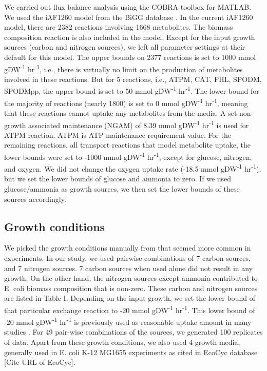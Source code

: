 \documentclass[12pt]{article}
\begin{document}
We carried out flux balance analysis using the COBRA toolbox \cite{Schellenbergeretal2011} for MATLAB. 
We used the iAF1260 model from the BiGG database \cite{Schellenbergeretal2010}. In the current iAF1260 model, there are 2382 reactions involving 1668 metabolites. The biomass composition reaction is also included in the model. Except for the input growth sources (carbon and nitrogen sources), we left all parameter settings at their default for this model. The upper bounds on 2377 reactions is set to 1000  mmol gDW\textsuperscript{-1} hr\textsuperscript{-1}, i.e., there is virtually no limit on the production of metabolites involved in these reactions. But for 5 reactions, i.e., ATPM, CAT, FHL, SPODM, SPODMpp, the upper bound is set to 50 mmol gDW\textsuperscript{-1} hr\textsuperscript{-1}. The lower bound for the majority of reactions (nearly 1800) is set to 0 mmol gDW\textsuperscript{-1} hr\textsuperscript{-1}, meaning that these reactions cannot uptake any metabolites from the media. A set non-growth associated maintenance (NGAM) of 8.39  mmol gDW\textsuperscript{-1} hr\textsuperscript{-1} is used for ATPM reaction. ATPM is ATP maintenance requirement value. For the remaining reactions, all transport reactions that model metabolite uptake, the lower bounds were set to -1000 mmol gDW\textsuperscript{-1} hr\textsuperscript{-1}, except for glucose, nitrogen, and oxygen. We did not change the oxygen uptake rate (-18.5 mmol gDW\textsuperscript{-1} hr\textsuperscript{-1}), but we set the lower bounds of glucose and ammonia to zero. If we used glucose/ammonia as growth sources, we then set the lower bounds of these sources accordingly.

\subsection*{Growth conditions} 
We picked the growth conditions manually from \cite{Feistetal2007} that seemed more common in experiments. In our study, we used pairwise combinations of 7 carbon sources, and 7 nitrogen sources. 7 carbon sources when used alone did not result in any growth. On the other hand, the nitrogen sources except ammonia contributed to E. coli biomass composition that is non-zero. These carbon and nitrogen sources are listed in Table I. Depending on the input growth, we set the lower bound of that particular exchange reaction to -20 mmol gDW\textsuperscript{-1} hr\textsuperscript{-1}. This lower bound of -20 mmol gDW\textsuperscript{-1} hr\textsuperscript{-1} is previously used as reasonable uptake amount in many studies \cite{Feistetal2007}. For 49 pair-wise combinations of the sources, we generated 100 replicates of data. Apart from these growth conditions, we also used 4 growth media, generally used in E. coli K-12 MG1655 experiments as cited in EcoCyc database [Cite URL of EcoCyc].
\end{document}
